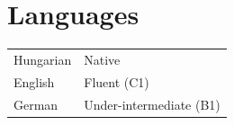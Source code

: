 \documentclass[10.5pt,a4paper]{article}
\newcommand{\entry}[5][]{%
  \textbf{#2} \hfill #3 \\
  \textit{#4} \hfill \textit{#5}
  \if\relax\detokenize{#1}\relax\else\\ {\small #1}\fi
  \par\vspace{0.2em}}
\begin{document}
% 

\section{Languages}
\begin{tabular}{@{}p{3cm}p{5cm}@{}}
  Hungarian  & Native \\
  English & Fluent (C1) \\
  German  & Under-intermediate (B1) \\
\end{tabular}
\end{document}
